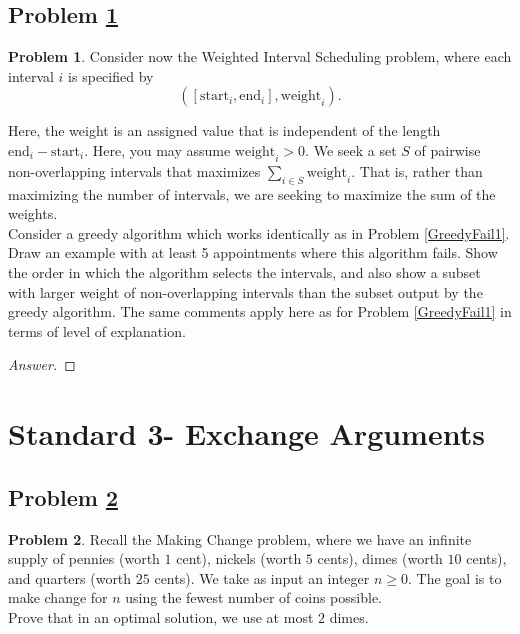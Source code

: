 \documentclass[11pt]{article}
\theoremstyle{definition}
\theoremstyle{definition}
\newtheorem{required}{Problem}
\theoremstyle{definition}
\begin{document}
\subsection{Problem \ref{GreedyFail3}}
\begin{required} \label{GreedyFail3}
Consider now the \textsf{Weighted Interval Scheduling} problem, where each interval $i$ is specified by 
\[
([\text{start}_{i}, \text{end}_{i}], \text{weight}_{i}). 
\]

\noindent Here, the weight is an assigned value that is independent of the length $\text{end}_{i} - \text{start}_{i}$. Here, you may assume $\text{weight}_{i} > 0$. We seek a set $S$ of pairwise non-overlapping intervals that maximizes $\sum_{i \in S} \text{weight}_{i}$. That is, rather than maximizing the number of intervals, we are seeking to maximize the sum of the weights. \\

\noindent Consider a greedy algorithm which works identically as in Problem \ref{GreedyFail1}. Draw an example with at least 5 appointments where this algorithm fails. Show the order in which the algorithm selects the intervals, and also show a subset with larger weight of non-overlapping intervals than the subset output by the greedy algorithm. The same comments apply here as for Problem \ref{GreedyFail1} in terms of level of explanation.
\end{required}

\begin{proof}[Answer]
\end{proof}




\newpage
\section{Standard 3- Exchange Arguments}
\subsection{Problem \ref{Exchange1}}
\begin{required} \label{Exchange1}
Recall the Making Change problem, where we have an infinite supply of pennies (worth $1$ cent), nickels (worth $5$ cents), dimes (worth $10$ cents), and quarters (worth $25$ cents). We take as input an integer $n \geq 0$. The goal is to make change for $n$ using the fewest number of coins possible. \\

\noindent Prove that in an optimal solution, we use at most $2$ dimes. 
\end{required}
\end{document}
